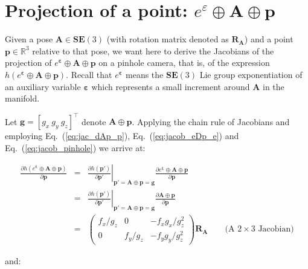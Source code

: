 \documentclass[a4paper,11pt]{report}
\newcommand{\E}{{\bm{\varepsilon}}}
\newcommand{\A}{{\mathbf{A}}}
\begin{document}
\section{Projection of a point: $e^\varepsilon \oplus \mathbf{A} \oplus \mathbf{p}$}

Given a pose $\mathbf{A} \in \mathbf{SE}(3)$
(with rotation matrix denoted as $\mathbf{R_A}$)
and a point
$\mathbf{p} \in \mathbb{R}^3$
relative to that pose, we want here to derive the Jacobians of
the projection of $e^\E \oplus \A \oplus \mathbf{p}$ on a pinhole camera, that is,
of the expression $h(e^\E \oplus \A \oplus \mathbf{p})$.
Recall that $e^\E$ means the $\mathbf{SE}(3)$ Lie group exponentiation
of an auxiliary variable $\E$ which represents a small increment around $\A$ in the manifold.

Let $\mathbf{g}=[g_x ~ g_y ~ g_z]^\top$ denote $\mathbf{A} \oplus \mathbf{p}$.
Applying the chain rule of Jacobians and employing Eq.~(\ref{eq:jac_dAp_p}),
Eq.~(\ref{eq:jacob_eDp_e})
and  Eq.~(\ref{eq:jacob_pinhole})
we arrive at:

\begin{eqnarray}
\frac{\partial h(e^\E \oplus \A \oplus \mathbf{p})}{\partial \mathbf{p}}
&=&
\left. \frac{\partial h(\mathbf{p'})}{\partial \mathbf{p'}} \right|_{ \mathbf{p'} = \A \oplus \mathbf{p} = \mathbf{g} }
\frac{\partial e^\E \oplus \A \oplus \mathbf{p} }{\partial \mathbf{p}} \\
&=&
\left. \frac{\partial h(\mathbf{p'})}{\partial \mathbf{p'}} \right|_{ \mathbf{p'} = \A \oplus \mathbf{p} = \mathbf{g} }
\frac{\partial \A \oplus \mathbf{p} }{\partial \mathbf{p}} \\
&=&
\left(
\begin{array}{ccc}
 f_x / g_z   &    0    &  -f_x g_x / g_z^2   \\
 0 & f_y / g_z  &  -f_y g_y / g_z^2
\end{array}
\right)
\mathbf{R_A}
\quad\quad \text{(A $2 \times 3$ Jacobian)}
\end{eqnarray}

\noindent and:
\end{document}
